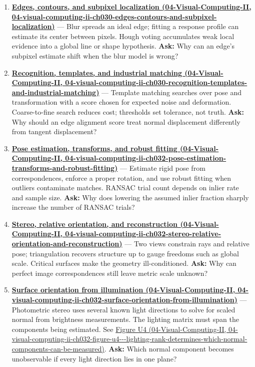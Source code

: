 \begin{enumerate}
\item
  \textbf{\href{../04-Visual-Computing-II/main.pdf\#nameddest=04-visual-computing-ii-ch030-edges-contours-and-subpixel-localization}{Edges, contours, and subpixel localization (04-Visual-Computing-II, 04-visual-computing-ii-ch030-edges-contours-and-subpixel-localization)}} --- Blur spreads an ideal edge; fitting a response profile can estimate its center between pixels. Hough voting accumulates weak local evidence into a global line or shape hypothesis. \textbf{Ask:} Why can an edge's subpixel estimate shift when the blur model is wrong?
\item
  \textbf{\href{../04-Visual-Computing-II/main.pdf\#nameddest=04-visual-computing-ii-ch030-recognition-templates-and-industrial-matching}{Recognition, templates, and industrial matching (04-Visual-Computing-II, 04-visual-computing-ii-ch030-recognition-templates-and-industrial-matching)}} --- Template matching searches over pose and transformation with a score chosen for expected noise and deformation. Coarse-to-fine search reduces cost; thresholds set tolerance, not truth. \textbf{Ask:} Why should an edge alignment score treat normal displacement differently from tangent displacement?
\item
  \textbf{\href{../04-Visual-Computing-II/main.pdf\#nameddest=04-visual-computing-ii-ch032-pose-estimation-transforms-and-robust-fitting}{Pose estimation, transforms, and robust fitting (04-Visual-Computing-II, 04-visual-computing-ii-ch032-pose-estimation-transforms-and-robust-fitting)}} --- Estimate rigid pose from correspondences, enforce a proper rotation, and use robust fitting when outliers contaminate matches. RANSAC trial count depends on inlier rate and sample size. \textbf{Ask:} Why does lowering the assumed inlier fraction sharply increase the number of RANSAC trials?
\item
  \textbf{\href{../04-Visual-Computing-II/main.pdf\#nameddest=04-visual-computing-ii-ch032-stereo-relative-orientation-and-reconstruction}{Stereo, relative orientation, and reconstruction (04-Visual-Computing-II, 04-visual-computing-ii-ch032-stereo-relative-orientation-and-reconstruction)}} --- Two views constrain rays and relative pose; triangulation recovers structure up to gauge freedoms such as global scale. Critical surfaces make the geometry ill-conditioned. \textbf{Ask:} Why can perfect image correspondences still leave metric scale unknown?
\item
  \textbf{\href{../04-Visual-Computing-II/main.pdf\#nameddest=04-visual-computing-ii-ch032-surface-orientation-from-illumination}{Surface orientation from illumination (04-Visual-Computing-II, 04-visual-computing-ii-ch032-surface-orientation-from-illumination)}} --- Photometric stereo uses several known light directions to solve for scaled normal from brightness measurements. The lighting matrix must span the components being estimated. See \href{../04-Visual-Computing-II/main.pdf\#nameddest=04-visual-computing-ii-ch032-figure-u4---lighting-rank-determines-which-normal-components-can-be-measured}{Figure U4 (04-Visual-Computing-II, 04-visual-computing-ii-ch032-figure-u4-\/-\/-lighting-rank-determines-which-normal-components-can-be-measured)}. \textbf{Ask:} Which normal component becomes unobservable if every light direction lies in one plane?

\end{enumerate}
